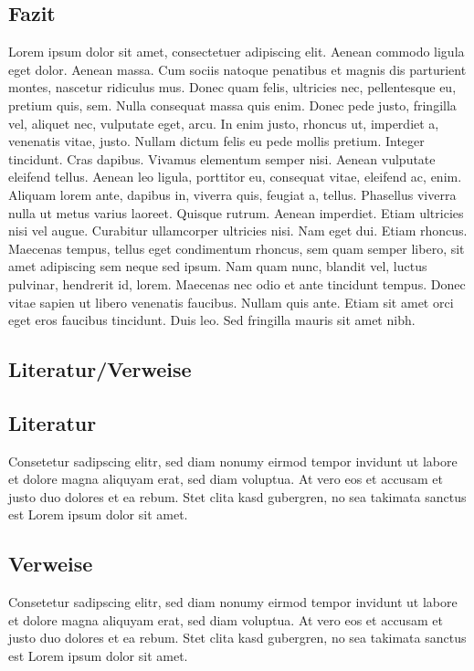 \documentclass[a1paper]{article}
\begin{document}
\begin{posterbox}
	\vspace{-10mm}
	\raggedright

	\section*{Fazit}
	Lorem ipsum dolor sit amet, consectetuer adipiscing elit. Aenean commodo ligula eget dolor. Aenean massa. Cum sociis natoque penatibus et magnis dis parturient montes, nascetur ridiculus mus. Donec quam felis, ultricies nec, pellentesque eu, pretium quis, sem. Nulla consequat massa quis enim. Donec pede justo, fringilla vel, aliquet nec, vulputate eget, arcu. In enim justo, rhoncus ut, imperdiet a, venenatis vitae, justo. Nullam dictum felis eu pede mollis pretium. Integer tincidunt. Cras dapibus. Vivamus elementum semper nisi. Aenean vulputate eleifend tellus. Aenean leo ligula, porttitor eu, consequat vitae, eleifend ac, enim. Aliquam lorem ante, dapibus in, viverra quis, feugiat a, tellus. Phasellus viverra nulla ut metus varius laoreet. Quisque rutrum. Aenean imperdiet. Etiam ultricies nisi vel augue. Curabitur ullamcorper ultricies nisi. Nam eget dui. Etiam rhoncus. Maecenas tempus, tellus eget condimentum rhoncus, sem quam semper libero, sit amet adipiscing sem neque sed ipsum. Nam quam nunc, blandit vel, luctus pulvinar, hendrerit id, lorem. Maecenas nec odio et ante tincidunt tempus. Donec vitae sapien ut libero venenatis faucibus. Nullam quis ante. Etiam sit amet orci eget eros faucibus tincidunt. Duis leo. Sed fringilla mauris sit amet nibh.
\end{posterbox}

\vfill

\begin{posterbox}
	\vspace{-10mm}
	\raggedright

	\section*{Literatur/Verweise}
	\subsection*{Literatur}
	Consetetur sadipscing elitr, sed diam nonumy eirmod tempor invidunt ut labore et dolore magna aliquyam erat, sed diam voluptua. At vero eos et accusam et justo duo dolores et ea rebum. Stet clita kasd gubergren, no sea takimata sanctus est Lorem ipsum dolor sit amet.

	\subsection*{Verweise}
	Consetetur sadipscing elitr, sed diam nonumy eirmod tempor invidunt ut labore et dolore magna aliquyam erat, sed diam voluptua. At vero eos et accusam et justo duo dolores et ea rebum. Stet clita kasd gubergren, no sea takimata sanctus est Lorem ipsum dolor sit amet.
\end{posterbox}
\end{document}
